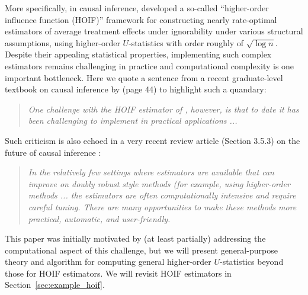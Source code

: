 \documentclass[twoside,11pt]{article}
\begin{document}
More specifically, in causal inference, \citet{robins2008higher, robins2017minimax} developed a so-called ``higher-order influence function (HOIF)'' framework for constructing nearly rate-optimal estimators of average treatment effects under ignorability under various structural assumptions, using higher-order $U$-statistics with order roughly of $\sqrt{\log n}$. Despite their appealing statistical properties, implementing such complex estimators remains challenging in practice and computational complexity is one important bottleneck. Here we quote a sentence from a recent graduate-level textbook on causal inference by \citet{wager2024causal} (page 44) to highlight such a quandary:
\begin{quote}
\emph{One challenge with the HOIF estimator of \citet{robins2017minimax}, however, is that to date it has been challenging to implement in practical applications ...}
\end{quote}
Such criticism is also echoed in a very recent review article (Section 3.5.3) on the future of causal inference \citep{cinelli2025challenges}:
\begin{quote}
\emph{In the relatively few settings where estimators are available that can improve on doubly robust style methods (for example, using higher-order methods ... the estimators are often computationally intensive and require careful tuning. There are many opportunities to make these methods more practical, automatic, and user-friendly.}
\end{quote}

This paper was initially motivated by (at least partially) addressing the computational aspect of this challenge, but we will present general-purpose theory and algorithm for computing general higher-order $U$-statistics beyond those for HOIF estimators. We will revisit HOIF estimators in Section~\ref{sec:example_hoif}. 
\end{document}
